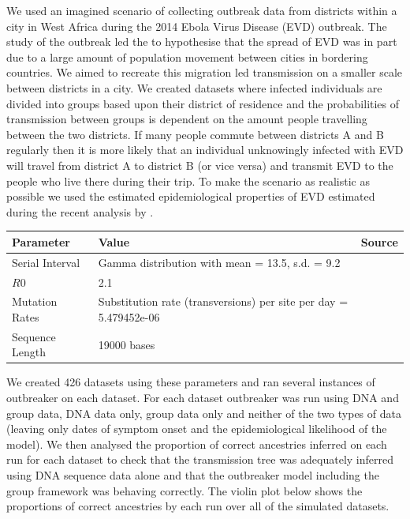 \documentclass[11pt,a4paper]{report}
\begin{document}
We used an imagined scenario of collecting outbreak data from districts within a city in West Africa during the 2014 Ebola Virus Disease (EVD) outbreak. The study of the outbreak led the \citet{Ebola14} to hypothesise that the spread of EVD was in part due to a large amount of population movement between cities in bordering countries. We aimed to recreate this migration led transmission on a smaller scale between districts in a city. We created datasets where infected individuals are divided into groups based upon their district of residence and the probabilities of transmission between groups is dependent on the amount people travelling between the two districts. If many people commute between districts A and B regularly then it is more likely that an individual unknowingly infected with EVD will travel from district A to district B (or vice versa) and transmit EVD to the people who live there during their trip. To make the scenario as realistic as possible  we used the estimated epidemiological properties of EVD estimated during the recent analysis by \citet{Ebola14}.
\begin{center}
\begin{tabular}{| l | p{4cm} | p{4cm} |}
\hline
Parameter & Value & Source \\
\hline
Serial Interval & Gamma distribution with mean = 13.5, s.d. = 9.2 & \citet{Ebola14} \\
\hline
$R0$ & 2.1 & \citet{Ebola14} \\
\hline
Mutation Rates & Substitution rate (transversions) per site per day =  5.479452e-06 & \citet{Gire14} \\
\hline
Sequence Length & 19000 bases & \citet{Volchkov99} \\
\hline
\end{tabular}
\end{center}
We created 426 datasets using these parameters and ran several instances of outbreaker on each dataset. For each dataset outbreaker was run using DNA and group data, DNA data only, group data only and neither of the two types of data (leaving only dates of symptom onset and the epidemiological likelihood of the model). We then analysed the proportion of correct ancestries inferred on each run for each dataset to check that the transmission tree was adequately inferred using DNA sequence data alone and that the outbreaker model including the group framework was behaving correctly. The violin plot below shows the proportions of correct ancestries by each run over all of the simulated datasets. 
\end{document}
